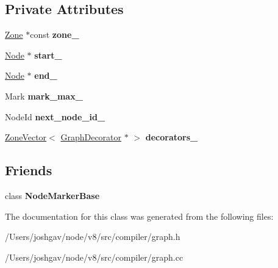\subsection*{Private Attributes}
\begin{DoxyCompactItemize}
\item 
\hyperlink{classv8_1_1internal_1_1_zone}{Zone} $\ast$const {\bfseries zone\+\_\+}\hypertarget{classv8_1_1internal_1_1compiler_1_1_graph_a06077b7a6ccd7b08a6c639a273e39440}{}\label{classv8_1_1internal_1_1compiler_1_1_graph_a06077b7a6ccd7b08a6c639a273e39440}

\item 
\hyperlink{classv8_1_1internal_1_1compiler_1_1_node}{Node} $\ast$ {\bfseries start\+\_\+}\hypertarget{classv8_1_1internal_1_1compiler_1_1_graph_a250c25aa841eb0c616c40524ab4429ab}{}\label{classv8_1_1internal_1_1compiler_1_1_graph_a250c25aa841eb0c616c40524ab4429ab}

\item 
\hyperlink{classv8_1_1internal_1_1compiler_1_1_node}{Node} $\ast$ {\bfseries end\+\_\+}\hypertarget{classv8_1_1internal_1_1compiler_1_1_graph_af0a1e3971b23d4b9e7fd81343de11ef8}{}\label{classv8_1_1internal_1_1compiler_1_1_graph_af0a1e3971b23d4b9e7fd81343de11ef8}

\item 
Mark {\bfseries mark\+\_\+max\+\_\+}\hypertarget{classv8_1_1internal_1_1compiler_1_1_graph_aadccb04d908a8750ce5c61a12235cf9c}{}\label{classv8_1_1internal_1_1compiler_1_1_graph_aadccb04d908a8750ce5c61a12235cf9c}

\item 
Node\+Id {\bfseries next\+\_\+node\+\_\+id\+\_\+}\hypertarget{classv8_1_1internal_1_1compiler_1_1_graph_a673670b29c5408fc7bf97b9a78e01ff3}{}\label{classv8_1_1internal_1_1compiler_1_1_graph_a673670b29c5408fc7bf97b9a78e01ff3}

\item 
\hyperlink{classv8_1_1internal_1_1_zone_vector}{Zone\+Vector}$<$ \hyperlink{classv8_1_1internal_1_1compiler_1_1_graph_decorator}{Graph\+Decorator} $\ast$ $>$ {\bfseries decorators\+\_\+}\hypertarget{classv8_1_1internal_1_1compiler_1_1_graph_a06f6d5a40a7e9e6d726a78043ad0b1d4}{}\label{classv8_1_1internal_1_1compiler_1_1_graph_a06f6d5a40a7e9e6d726a78043ad0b1d4}

\end{DoxyCompactItemize}
\subsection*{Friends}
\begin{DoxyCompactItemize}
\item 
class {\bfseries Node\+Marker\+Base}\hypertarget{classv8_1_1internal_1_1compiler_1_1_graph_a300aff091dd808ac2a77b73336b03672}{}\label{classv8_1_1internal_1_1compiler_1_1_graph_a300aff091dd808ac2a77b73336b03672}

\end{DoxyCompactItemize}


The documentation for this class was generated from the following files\+:\begin{DoxyCompactItemize}
\item 
/\+Users/joshgav/node/v8/src/compiler/graph.\+h\item 
/\+Users/joshgav/node/v8/src/compiler/graph.\+cc\end{DoxyCompactItemize}
